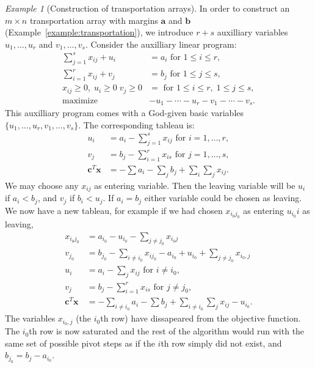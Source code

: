 \documentclass{amsbook}
\newcommand{\xx}{\mathbf x}
\newcommand{\cc}{\mathbf c}
\newcommand{\bb}{\mathbf b}
\renewcommand{\aa}{\mathbf a}
\theoremstyle{definition}
\theoremstyle{remark}
\newtheorem{example}[theorem]{Example}
\begin{document}
\begin{example}
  [Construction of transportation arrays]
  \label{example:transportation-vertex-algo}
  In order to construct an $m\times n$ transportation array with margins $\aa$ and $\bb$ (Example~\ref{example:transportation}), we introduce $r+s$ auxilliary variables $u_1,\dotsc,u_r$ and $v_1,\dotsc,v_s$.
  Consider the auxilliary linear program:
  \begin{align*}
    \sum_{j=1}^s x_{ij} + u_i & = a_i \text{ for } 1\leq i\leq r,\\
    \sum_{i=1}^r x_{ij} + v_j & = b_j \text{ for } 1\leq j\leq s,\\
    x_{ij}\geq 0,\;u_i\geq 0\;v_j\geq 0 &= \text{ for } 1\leq i\leq r,\;1\leq j\leq s,\\
    \text{maximize} & -u_1-\dotsb -u_r - v_1 - \dotsb -v_s.
  \end{align*}
  This auxilliary program comes with a God-given basic variables $\{u_1,\dotsc,u_r,v_1,\dotsc,v_s\}$.
  The corresponding tableau is:
  \begin{align*}
    u_i & = a_i - \sum_{j=1}^s x_{ij} \text{ for } i=1,\dotsc,r,\\
    v_j & = b_j - \sum_{i=1}^r x_{is} \text{ for } j=1,\dotsc,s,\\
    \hline
    \cc^T\xx &= -\sum a_i - \sum_j b_j + \sum_i\sum_j x_{ij}. 
  \end{align*}
  We may choose any $x_{ij}$ as entering variable.
  Then the leaving variable will be $u_i$ if $a_i<b_j$, and $v_j$ if $b_i<u_j$.
  If $a_i=b_j$ either variable could be chosen as leaving.
  We now have a new tableau, for example if we had chosen $x_{i_0j_0}$ as entering $u_{i_0}i$ as leaving,
  \begin{align*}
    x_{i_0j_0} & = a_{i_0} - u_{i_0} -\sum_{j\neq j_0} x_{i_0j}\\
    v_{j_0} & = b_{j_0} - \sum_{i\neq i_0} x_{ij_0} - a_{i_0} + u_{i_0} + \sum_{j\neq j_0} x_{i_0,j}\\
    u_i & = a_i - \sum_j x_{ij} \text{ for }i\neq i_0,\\
    v_j & = b_j - \sum_{i=1}^r x_{is} \text{ for } j\neq j_0,\\
    \hline
    \cc^T\xx & = -\sum_{i\neq i_0} a_i - \sum b_j + \sum_{i\neq i_0}\sum_jx_{ij} -u_{i_0}. 
  \end{align*}
  The variables $x_{i_0,j}$ (the $i_0$th row) have dissapeared from the objective function.
  The $i_0$th row is now saturated and the rest of the algorithm would run with the same set of possible pivot steps as if the $i$th row simply did not exist, and $b_{j_0}=b_j-a_{i_0}$.

\end{example}
\end{document}
